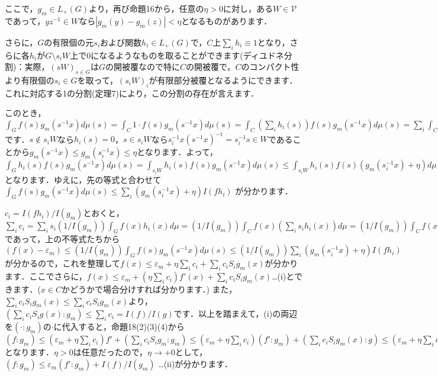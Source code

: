 ここで，$g_{m} \in L_{+}(G)$より，再び命題16から，任意の$\eta >0$に対し，ある$W \in \mathscr{V}$であって，$yz^{-1} \in W$なら$|g_{m}(y)-g_{m}(z)|<\eta$となるものがあります．

さらに，$G$の有限個の元$s_{i}$および関数$h_i \in L_{+}(G)$で，$C$上$\sum_{i}h_i \equiv 1$となり，さらに各$h_i$が$G \setminus s_{i}W$上で0になるようなものを取ることができます(ディユドネ分割)：実際，$(sW)_{s \in G}$は$G$の開被覆なので特に$C$の開被覆で，$C$のコンパクト性より有限個の$s_i \in G$を取って，$(s_{i}W)_{i}$が有限部分被覆となるようにできます．これに対応する1の分割(定理7)により，この分割の存在が言えます．

このとき，$\int_{G}f(s)g_{m}(s^{-1}x)d\mu(s)=\int_{C}1 \cdot f(s)g_{m}(s^{-1}x)d\mu(s)=\int_{C} \left( \sum_{i}h_{i}(s) \right) f(s)g_{m}(s^{-1}x)d\mu(s)=\sum_{i} \int_{C}h_{i}(s)f(s)g_{m}(s^{-1}x)d\mu(s)=\sum_{i} \int_{G}h_{i}(s)f(s)g_{m}(s^{-1}x)d\mu(s)$です．$s \not\in s_{i}W$なら$h_{i}(s)=0$，$s \in s_{i}W$なら$s_{i}^{-1}x(s^{-1}x)^{-1}=s_{i}^{-1}s \in W$であることから$g_{m}(s^{-1}x) \le g_{m}(s_{i}^{-1}x) \le \eta$となります．よって， $\int_{G}h_{i}(s)f(s)g_{m}(s^{-1}x)d\mu(s)=\int_{s_{i}W}h_{i}(s)f(s)g_{m}(s^{-1}x)d\mu(s) \le \int_{s_{i}W}h_{i}(s)f(s)\left( g_{m}(s_{i}^{-1}x) + \eta \right) d\mu(s)=\left( g_{m}(s_{i}^{-1}x) + \eta \right) \int_{G}h_{i}(s)f(s)d\mu(s)=\left( g_{m}(s_{i}^{-1}x) + \eta \right)I(fh_{i})$となります．ゆえに，先の等式と合わせて$\int_{G}f(s)g_{m}(s^{-1}x)d\mu(s) \le \sum_{i}\left( g_{m}(s_{i}^{-1}x) + \eta \right)I(fh_{i})$ が分かります．

$c_i=I(fh_i)/I(g_{m})$とおくと，$\sum_{i}c_{i}=\sum_{i}s_{i}\left( 1/I(g_{m}) \right) \int_{G}f(x)h_{i}(x)d\mu=\left( 1/I(g_{m}) \right) \int_{C}f(x) \left( \sum_{i}s_{i}h_{i}(x) \right) d\mu=\left( 1/I(g_{m}) \right) \int_{C}f(x) d\mu=\left( 1/I(g_{m}) \right) \int_{G}f(x) d\mu=I(f)/I(g_{m})$であって，上の不等式たちから $(f(x)-\varepsilon_{m}) \le \left( 1/I(g_{m}) \right)\int_{G}f(s)g_{m}(s^{-1}x)d\mu(s) \le \left( 1/I(g_{m}) \right) \sum_{i}\left( g_{m}(s_{i}^{-1}x) + \eta \right)I(fh_{i})$が分かるので，これを整理して$f(x) \le \varepsilon_{m} + \eta \sum_{i}c_{i} + \sum_{i}c_{i}S_{i}g_{m}(x)$が分かります．ここでさらに，$f(x) \le \varepsilon_{m} + \left( \eta \sum_{i}c_{i} \right)f'(x) + \sum_{i}c_{i}S_{i}g_{m}(x)$…(i)とできます．($x \in C$かどうかで場合分けすれば分かります．) また，$\sum_{i}c_{i}S_{i}g_{m}(x) \le \sum_{i}c_{i}S_{i}g_{m}(x)$より， $\left( \sum_{i}c_{i}S_{i}g(x) \colon g_{m} \right) \le \sum_{i}c_{i}=I(f)/I(g)$です．以上を踏まえて，(i)の両辺を$\left( \cdot \colon g_{m} \right) $の$\cdot$に代入すると，命題18(2)(3)(4)から $\left( f \colon g_{m} \right) \le \left( \varepsilon_{m} + \eta \sum_{i}c_{i} \right)f' + \left( \sum_{i}c_{i}S_{i}g_{m} \colon g_{m} \right) \le \left( \varepsilon_{m} + \eta \sum_{i}c_{i} \right) \left( f' \colon g_{m} \right) + \left( \sum_{i}c_{i}S_{i}g_{m}(x) \colon g \right) \le \left( \varepsilon_{m} + \eta \sum_{i}c_{i} \right) \left( f' \colon g_{m} \right) + I(f)/I(g_{m})$ となります．$\eta>0$は任意だったので，$\eta \to +0$として，$\left( f \colon g_{m} \right) \le \varepsilon_{m} \left( f' \colon g_{m} \right) + I(f)/I(g_{m})$ …(ii)が分かります．

